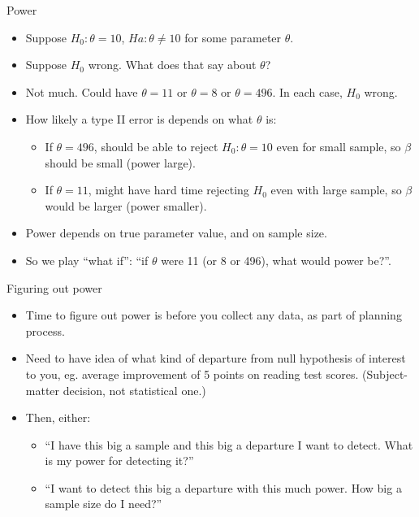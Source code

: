 \documentclass[ignorenonframetext,]{beamer}
\providecommand{\tightlist}{%
  \setlength{\itemsep}{0pt}\setlength{\parskip}{0pt}}
\begin{document}
\begin{frame}{Power}
\protect\hypertarget{power}{}

\begin{itemize}
\tightlist
\item
  Suppose \(H_0 : \theta = 10\), \(H a : \theta \ne 10\) for some
  parameter \(\theta\).
\item
  Suppose \(H_0\) wrong. What does that say about \(\theta\)?
\item
  Not much. Could have \(\theta = 11\) or \(\theta = 8\) or
  \(\theta = 496\). In each case, \(H_0\) wrong.
\item
  How likely a type II error is depends on what \(\theta\) is:

  \begin{itemize}
  \tightlist
  \item
    If \(\theta = 496\), should be able to reject \(H_0 : \theta = 10\)
    even for small sample, so \(\beta\) should be small (power large).
  \item
    If \(\theta = 11\), might have hard time rejecting \(H_0\) even with
    large sample, so \(\beta\) would be larger (power smaller).
  \end{itemize}
\item
  Power depends on true parameter value, and on sample size.
\item
  So we play ``what if'': ``if \(\theta\) were 11 (or 8 or 496), what
  would power be?''.
\end{itemize}

\end{frame}

\begin{frame}{Figuring out power}
\protect\hypertarget{figuring-out-power}{}

\begin{itemize}
\tightlist
\item
  Time to figure out power is before you collect any data, as part of
  planning process.
\item
  Need to have idea of what kind of departure from null hypothesis of
  interest to you, eg. average improvement of 5 points on reading test
  scores. (Subject-matter decision, not statistical one.)
\item
  Then, either:

  \begin{itemize}
  \tightlist
  \item
    ``I have this big a sample and this big a departure I want to
    detect. What is my power for detecting it?''
  \item
    ``I want to detect this big a departure with this much power. How
    big a sample size do I need?''
  \end{itemize}
\end{itemize}

\end{frame}
\end{document}
